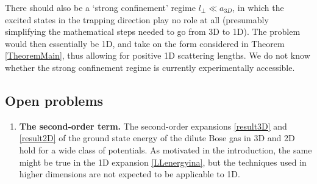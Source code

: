 \documentclass[a4paper,11pt]{article}
\numberwithin{equation}{section}
\begin{document}
	There should also be a `strong confinement' regime $l_\perp\ll a_{3D}$, in which the excited states in the trapping direction play no role at all (presumably simplifying the mathematical steps needed to go from 3D to 1D). The problem would then essentially be 1D, and take on the form considered in Theorem \ref{TheoremMain}, thus allowing for positive 1D scattering lengths. We do not know whether the strong confinement regime is currently experimentally accessible. 
	
	
	
	\subsection{Open problems}
	\label{SecOpenproblems}
	\begin{enumerate}
		\item \textbf{The second-order term.}
		The second-order expansions \eqref{result3D} and \eqref{result2D} of the ground state energy of the dilute Bose gas in 3D and 2D hold for a wide class of potentials. As motivated in the introduction, the same might be true in the 1D expansion \eqref{LLenergyina}, but the techniques used in higher dimensions are not expected to be applicable to 1D. 
		

\end{enumerate}
\end{document}
